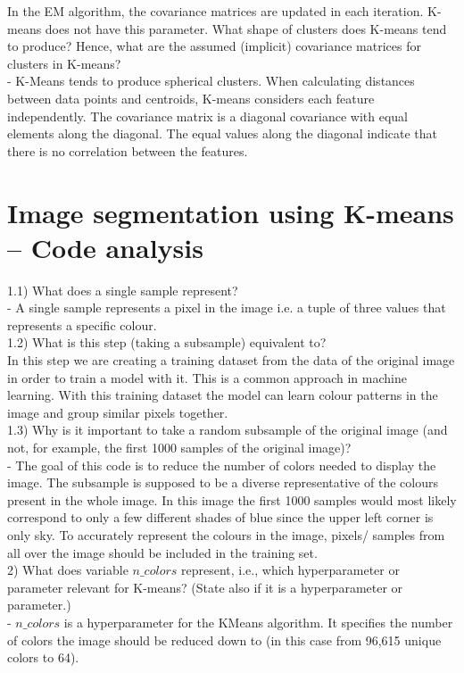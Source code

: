     In the EM algorithm, the covariance matrices are updated in each iteration. K-means does not have this parameter. What shape of clusters does K-means tend to produce? Hence, what are the assumed (implicit) covariance matrices for clusters in K-means? \\
    - K-Means tends to produce spherical clusters. When calculating distances between data points and centroids, K-means considers each feature independently. The covariance matrix is a diagonal covariance with equal elements along the diagonal. The equal values along the diagonal indicate that there is no correlation between the features.\\

    \section{Image segmentation using K-means -- Code analysis}

    1.1) What does a single sample represent? \\
    - A single sample represents a pixel in the image i.e. a tuple of three values that represents a specific colour. \\

    1.2) What is this step (taking a subsample) equivalent to? \\
    In this step we are creating a training dataset from the data of the original image in order to train a model with it. This is a common approach in machine learning. With this training dataset the model can learn colour patterns in the image and group similar pixels together. \\

    1.3) Why is it important to take a random subsample of the original image (and not, for example, the first 1000 samples of the original image)? \\
    - The goal of this code is to reduce the number of colors needed to display the image. The subsample is supposed to be a diverse representative of the colours present in the whole image. In this image the first 1000 samples would most likely correspond to only a few different shades of blue since the upper left corner is only sky. To accurately represent the colours in the image, pixels/ samples from all over the image should be included in the training set.\\

    2) What does variable $n\_colors$ represent, i.e., which hyperparameter or parameter relevant for K-means? (State also if it is a hyperparameter or parameter.) \\
    - $n\_colors$ is a hyperparameter for the KMeans algorithm. It specifies the number of colors the image should be reduced down to (in this case from 96,615 unique colors to 64).\\

